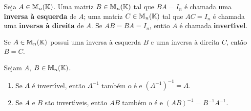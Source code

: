 \begin{definicao}
Seja $A \in \mathbb{M}_{n}(\mathbb{K})$. Uma matriz $B \in \mathbb{M}_{n}(\mathbb{K})$ tal que $BA = I_n$ \'e chamada uma \textbf{inversa \`a esquerda} de $A$; uma matriz $C \in \mathbb{M}_{n}(\mathbb{K})$ tal que $AC = I_n$ \'e chamada uma \textbf{inversa \`a direita} de $A$. Se $AB = BA = I_n$, ent\~ao $A$ \'e chamada \textbf{invert{\'\i}vel}.
\end{definicao}

\begin{proposicao}
Se $A \in \mathbb{M}_{n}(\mathbb{K})$ possui uma inversa \`a esquerda $B$ e uma inversa \`a direita $C$, ent\~ao $B = C$.
\end{proposicao}

\begin{proposicao}
	Sejam $A$, $B \in \mathbb{M}_{n}(\mathbb{K})$.
	\begin{enumerate}
		\item Se $A$ \'e invert{\'\i}vel, ent\~ao $A^{-1}$ tamb\'em o \'e e $(A^{-1})^{-1} = A$.
		\item Se $A$ e $B$ s\~ao invert{\'\i}veis, ent\~ao $AB$ tamb\'em o \'e e $(AB)^{-1} = B^{-1}A^{-1}$.
	\end{enumerate}
\end{proposicao}

